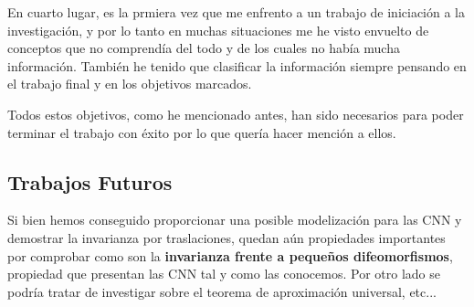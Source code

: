\medskip

\noindent En cuarto lugar, es la prmiera vez que me enfrento a un trabajo de iniciación a la investigación, y por lo tanto en muchas situaciones me he visto envuelto de conceptos que no comprendía del todo y de los cuales no había mucha información. También he tenido que clasificar la información siempre pensando en el trabajo final y en los objetivos marcados. 

\medskip

\noindent Todos estos objetivos, como he mencionado antes, han sido necesarios para poder terminar el trabajo con éxito por lo que quería hacer mención a ellos.

\subsection*{Trabajos Futuros}

\noindent Si bien hemos conseguido proporcionar una posible modelización para las CNN y demostrar la invarianza por traslaciones, quedan aún propiedades importantes por comprobar como son la \textbf{invarianza frente a pequeños difeomorfismos}, propiedad que presentan las CNN tal y como las conocemos. Por otro lado se podría tratar de investigar sobre el teorema de aproximación universal, etc...

\endinput